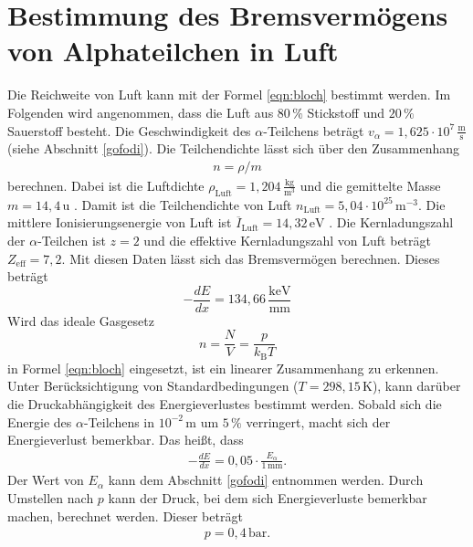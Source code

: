 \section{Bestimmung des Bremsvermögens von Alphateilchen in Luft}
Die Reichweite von Luft kann mit der Formel \eqref{eqn:bloch} bestimmt werden.
Im Folgenden wird angenommen, dass die Luft aus $80\,\%$ Stickstoff und $20\,\%$ Sauerstoff besteht.
Die Geschwindigkeit des $\alpha$-Teilchens beträgt $v_{\alpha}= 1,625\cdot10^{7}\,\frac{\text{m}}{\text{s}}$ (siehe Abschnitt \ref{gofodi}).
Die Teilchendichte lässt sich über den Zusammenhang
\begin{align*}
  n = \rho/m
\end{align*}
berechnen.
Dabei ist die Luftdichte $\rho_{\text{Luft}} = 1,204\,\frac{\text{kg}}{\text{m}^3}$ \cite{chem2} und die gemittelte Masse
$m = 14,4 \,\text{u}$ \cite{PSE}.
Damit ist die Teilchendichte von Luft $n_{\text{Luft}} = 5,04\cdot10^{25}\,\text{m}^{-3}$.
Die mittlere Ionisierungsenergie von Luft ist
$\overline{I}_{\text{Luft}} = 14,32\,\text{eV}$ \cite{PSE}.
Die Kernladungszahl der $\alpha$-Teilchen ist $z=2$ und die effektive Kernladungszahl von Luft beträgt
$Z_{\text{eff}} = 7,2$.
Mit diesen Daten lässt sich das Bremsvermögen berechnen. Dieses beträgt
\begin{equation*}
  -\frac{dE}{dx} = 134,66\,\frac{\text{keV}}{\text{mm}}
\end{equation*}
Wird das ideale Gasgesetz
\begin{equation}
  n = \frac{N}{V} = \frac{p}{k_{\text{B}}T}
\end{equation}
in Formel \eqref{eqn:bloch} eingesetzt,
ist ein linearer Zusammenhang zu erkennen.
Unter Berücksichtigung von Standardbedingungen ($T= 298,15\,\text{K}$), kann darüber die Druckabhängigkeit des Energieverlustes bestimmt werden.
Sobald sich die Energie des $\alpha$-Teilchens in $10^{-2}\,\text{m}$ um $5\,\%$ verringert, macht sich der Energieverlust bemerkbar.
Das heißt, dass
\begin{align*}
  -\frac{dE}{dx} = 0,05\cdot\frac{E_{\alpha}}{1\,\text{mm}}.
\end{align*}
Der Wert von $E_{\alpha}$ kann dem Abschnitt \ref{gofodi} entnommen werden.
Durch Umstellen nach $p$ kann der Druck, bei dem sich Energieverluste bemerkbar machen, berechnet werden.
Dieser beträgt
\begin{align*}
  p = 0,4\,\text{bar}.
\end{align*}
